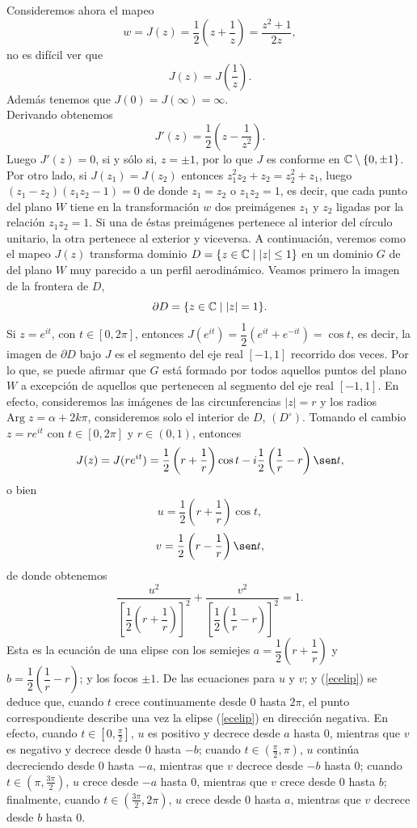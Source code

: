 Consideremos ahora el mapeo 
\begin{equation}
	w=J(z)=\dfrac{1}{2}\left(z+\dfrac{1}{z}\right)=\dfrac{z^2+1}{2z},
\end{equation}
no es difícil ver que 
\begin{equation}\label{derj}
	J(z)=J\left(\dfrac{1}{z}\right).
\end{equation}
Además tenemos que $J(0)=J(\infty)=\infty$. \\
Derivando obtenemos $$J'(z)=\dfrac{1}{2}\left(z-\dfrac{1}{z^2}\right).$$
Luego $J'(z)=0$, si y sólo si, $z=\pm 1$, por lo que $J$ es conforme en $\mathbb{C}\setminus\{0,\pm 1\}$. Por otro lado, si $J(z_1)=J(z_2)$ entonces $z_{1}^2z_2+z_2=z_{2}^2+z_1$, luego $(z_1-z_2)(z_1z_2-1)=0$ de donde $z_1=z_2$ o $z_1z_2=1$, es decir, que cada punto del plano $W$ tiene en la transformación $w$ dos preimágenes $z_1$ y $z_2$ ligadas por la relación $z_1z_2=1$. Si una de éstas preimágenes pertenece al interior del círculo unitario, la otra pertenece al exterior  y viceversa. A continuación, veremos como el mapeo $J(z)$ transforma dominio $D=\{z\in \mathbb{C}\mid |z|\leq 1 \}$ en un dominio $G$ de del plano $W$ muy parecido a un perfil aerodinámico. Veamos primero la imagen de la frontera de $D$, $$\partial D=\{z\in\mathbb{C}\mid |z|=1\}.$$
Si $z=e^{it}$, con $t\in[0,2\pi]$, entonces $J(e^{it})=\dfrac{1}{2}\left(e^{it}+e^{-it}\right)=\cos t$, es decir, la imagen de $\partial D$ bajo $J$ es el segmento del eje real $[-1,1]$ recorrido dos veces. Por lo que, se puede afirmar que $G$ está formado por todos aquellos puntos del plano $W$  a excepción de aquellos que pertenecen al segmento del eje real $[-1,1]$. En efecto, consideremos las imágenes de las circunferencias $|z|=r$ y los radios $\mbox{Arg}\; z=\alpha+2k\pi$, consideremos solo el interior de $D$, $(D^{\circ})$. Tomando el cambio $z=re^{it}$ con $t\in[0,2\pi]$ y $r\in (0,1)$, entonces
$$J(z)=J(re^{it})=\dfrac{1}{2}\left(r+\dfrac{1}{r}\right)\cos t-i\dfrac{1}{2}\left(\dfrac{1}{r}-r\right)\sen t,$$
o bien 
$$u=\dfrac{1}{2}\left(r+\dfrac{1}{r}\right)\cos t,$$
$$v=\dfrac{1}{2}\left(r-\dfrac{1}{r}\right)\sen t,$$
de donde obtenemos 
\begin{equation}\label{ecelip}
	\dfrac{u^2}{\left[\dfrac{1}{2}\left(r+\dfrac{1}{r}\right)\right]^2} +\dfrac{v^2}{\left[\dfrac{1}{2}\left(\dfrac{1}{r}-r\right)\right]^2}=1.
\end{equation}
Esta es la ecuación de una elipse con los semiejes $a=\dfrac{1}{2}\left(r+\dfrac{1}{r}\right)$ y $b=\dfrac{1}{2}\left(\dfrac{1}{r}-r\right)$; y los focos $\pm 1$. De las ecuaciones para $u$ y $v$; y (\ref{ecelip}) se deduce que, cuando $t$ crece continuamente desde $0$ hasta $2\pi$, el punto correspondiente describe una vez la elipse (\ref{ecelip}) en dirección negativa. En efecto, cuando $t\in[0,\frac{\pi}{2}]$, $u$ es positivo y decrece desde $a$ hasta $0$, mientras que $v$ es negativo y decrece desde $0$ hasta $-b$; cuando $t\in(\frac{\pi}{2},\pi)$, $u$ continúa decreciendo desde $0$ hasta $-a$, mientras que $v$ decrece desde $-b$ hasta $0$; cuando $t\in (\pi ,\frac{3\pi}{2})$, $u$ crece desde $-a$ hasta $0$, mientras que $v$ crece desde $0$ hasta $b$; finalmente, cuando $t\in (\frac{3\pi}{2},2\pi)$, $u$ crece desde $0$ hasta $a$, mientras que $v$ decrece desde $b$ hasta $0$.\\
